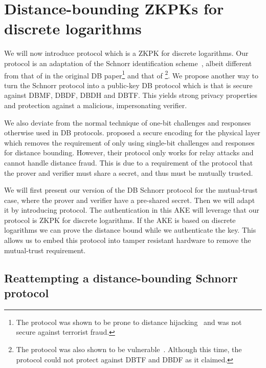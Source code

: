 \section{Distance-bounding \aclp*{ZKPK} for discrete logarithms}%
\label{DB-Schnorr-UWB}

We will now introduce  protocol which is a \ac{ZKPK} for discrete 
logarithms.
Our protocol is an adaptation of the Schnorr identification 
scheme~\cite{Schnorr}, albeit different from that of 
\textcite{DistanceBounding} in the original \ac{DB} paper\footnote{%
  The \citeauthor{DistanceBounding} protocol was shown to be prone to distance 
  hijacking~\cite{DistanceHijacking,TamarinDB} and was not secure against 
  terrorist fraud.
} and that of \textcite{Bussard-Bagga}\footnote{%
  The \citeauthor{Bussard-Bagga} protocol was also shown to be 
  vulnerable~\cite{Bussard-Bagga-attack}.
  Although this time, the protocol could not protect against \ac{DBTF} and 
  \ac{DBDF} as it claimed.
}.
We propose another way to turn the Schnorr protocol into a public-key \ac{DB} 
protocol which is  that is secure against \ac{DBMF}, \ac{DBDF}, 
\ac{DBDH} and \ac{DBTF}.
This yields strong privacy properties and protection against a malicious, 
impersonating verifier.

We also deviate from the normal technique of one-bit challenges and responses 
otherwise used in \ac{DB} protocols.
\Textcite{UWBPR} proposed a secure encoding for the physical 
layer which removes the requirement of only using single-bit challenges and 
responses for distance bounding.
However, their protocol only works for relay attacks and cannot handle distance 
fraud.
This is due to a requirement of the protocol that the prover and verifier must 
share a secret, and thus must be mutually trusted.

We will first present our version of the \ac{DB} Schnorr protocol for the 
mutual-trust case, where the prover and verifier have a pre-shared secret.
Then we will adapt it by introducing  protocol.
The authentication in this \ac{AKE} will leverage that our protocol is  
\ac{ZKPK} for discrete logarithms.
If the \ac{AKE} is based on discrete logarithms we can prove the distance bound 
while we authenticate the key.
This allows us to embed this protocol into tamper resistant hardware to remove 
the mutual-trust requirement.


\subsection{Reattempting a distance-bounding Schnorr protocol}%
\label{DB-Schnorr}

